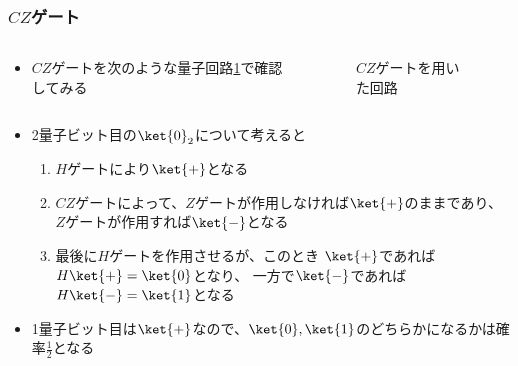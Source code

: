 \begin{frame}
  \frametitle{$CZ$ゲート}

  \begin{columns}
    \begin{column}{0.5\textwidth}
      \begin{itemize}
        \item $CZ$ゲートを次のような量子回路\ref{fig:cz_gate}で確認してみる
      \end{itemize}
    \end{column}
    \begin{column}{0.47\textwidth}
      \begin{figure}
        \caption{$CZ$ゲートを用いた回路}
        \label{fig:cz_gate}
      \end{figure}
    \end{column}
  \end{columns}

  \pause
  \begin{itemize}
    \item 2量子ビット目の$\ket{0}_2$について考えると
    \begin{enumerate}
      \item $H$ゲートにより$\ket{+}$となる \label{enum:cz_gate_1}

      \item $CZ$ゲートによって、$Z$ゲートが作用しなければ$\ket{+}$のままであり、
      $Z$ゲートが作用すれば$\ket{-}$となる \label{enum:cz_gate_2}

      \item 最後に$H$ゲートを作用させるが、このとき
      $\ket{+}$であれば$H\ket{+} = \ket{0}$となり、
      一方で$\ket{-}$であれば$H\ket{-} = \ket{1}$となる \label{enum:cz_gate_3}
    \end{enumerate}

    \item<+-> 1量子ビット目は$\ket{+}$なので、$\ket{0}, \ket{1}$のどちらかになるかは確率$\frac{1}{2}$となる
  \end{itemize}
\end{frame}

